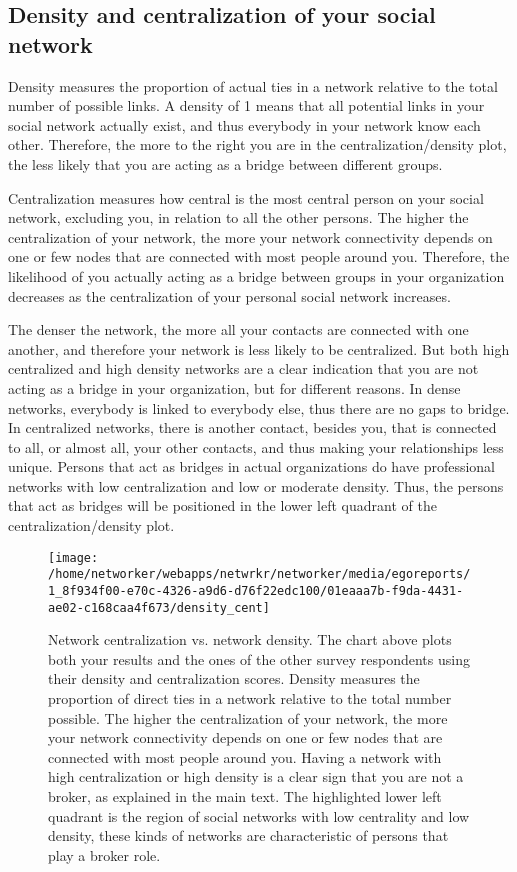 \documentclass[a4paper,12pt]{article}
\begin{document}
\subsection*{Density and centralization of your social network}


Density measures the proportion of actual ties in a network relative to the total number of possible links. A density of 1 means that all potential links in your social network actually exist, and thus everybody in your network know each other. Therefore, the more to the right you are in the centralization/density plot, the less likely that you are acting as a bridge between different groups.

Centralization measures how central is the most central person on your social network, excluding you, in relation to all the other persons. The higher the centralization of your network, the more your network connectivity depends on one or few nodes that are connected with most people around you. Therefore, the likelihood of you actually acting as a bridge between groups in your organization decreases as the centralization of your personal social network increases.

The denser the network, the more all your contacts are connected with one another, and therefore your network is less likely to be centralized. But both high centralized and high density networks are a clear indication that you are not acting as a bridge in your organization, but for different reasons. In dense networks, everybody is linked to everybody else, thus there are no gaps to bridge. In centralized networks, there is another contact, besides you, that is connected to all, or almost all, your other contacts, and thus making your relationships less unique. Persons that act as bridges in actual organizations do have professional networks with low centralization and low or moderate density. Thus, the persons that act as bridges will be positioned in the lower left quadrant of the centralization/density plot.


\begin{figure}[H]
\centering
\texttt{[image: /home/networker/webapps/netwrkr/networker/media/egoreports/1\_8f934f00-e70c-4326-a9d6-d76f22edc100/01eaaa7b-f9da-4431-ae02-c168caa4f673/density\_cent]}
\caption{Network centralization vs. network density. The chart above plots both your results and the ones of the other survey respondents using their density and centralization scores. Density measures the proportion of direct ties in a network relative to the total number possible. The higher the centralization of your network, the more your network connectivity depends on one or few nodes that are connected with most people around you. Having a network with high centralization or high density is a clear sign that you are not a broker, as explained in the main text. The highlighted lower left quadrant is the region of social networks with low centrality and low density, these kinds of networks are characteristic of persons that play a broker role.}
\end{figure}
\end{document}
